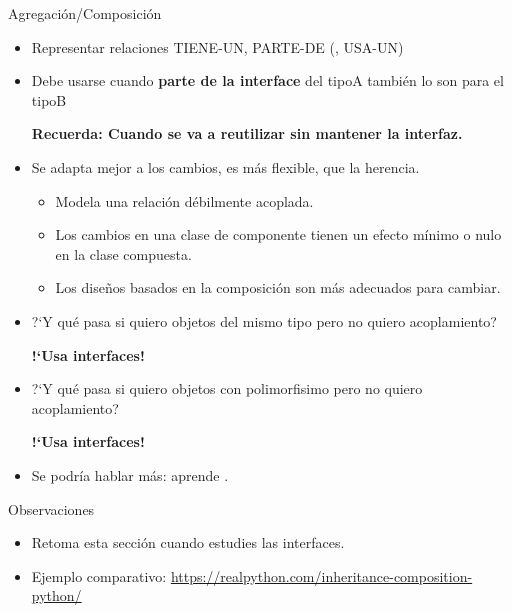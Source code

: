 \documentclass[10pt,envcountsect,spanish]{beamer}
\begin{document}





\begin{frame}{Agregación/Composición}
\begin{itemize}
\item Representar relaciones TIENE-UN, PARTE-DE (, USA-UN)
\item Debe usarse cuando \textbf{parte de la interface} del tipoA también lo son para el tipoB

 \textbf{Recuerda: Cuando se va a reutilizar sin mantener la interfaz.}


\item Se adapta mejor a los cambios, es más flexible, que la herencia. 

\begin{itemize}
\item Modela una relación débilmente acoplada. 
\item Los cambios en una clase de componente tienen un efecto mínimo o nulo en la clase compuesta. 
\item Los diseños basados en la composición son más adecuados para cambiar.
\end{itemize}


\item ?`Y qué pasa si quiero objetos del mismo tipo pero no quiero acoplamiento? \\
\centerline{\textbf{!`Usa interfaces!}}


\item ?`Y qué pasa si quiero objetos con polimorfisimo pero no quiero acoplamiento? \\
\centerline{\textbf{!`Usa interfaces!}}


\item Se podría hablar más: aprende .
\end{itemize}


\begin{block}{Observaciones}
\hfil\begin{minipage}{.7\textwidth}
\begin{itemize}
\item Retoma esta sección cuando estudies las interfaces.
\item Ejemplo comparativo: {\tiny \url{https://realpython.com/inheritance-composition-python/}}
\end{itemize}
\end{minipage}
\end{block}

\end{frame}
\end{document}
